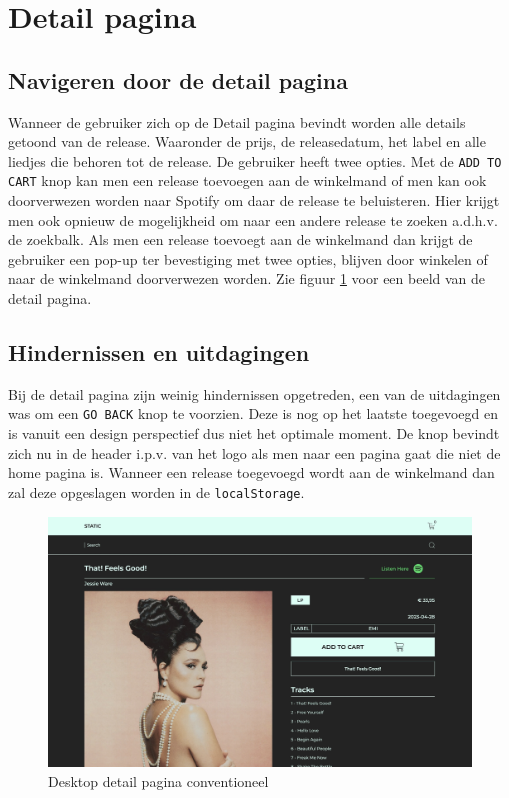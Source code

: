 \newpage

\section{Detail pagina}

\subsection{Navigeren door de detail pagina}

Wanneer de gebruiker zich op de Detail pagina bevindt worden alle details getoond van de release. Waaronder de prijs, de releasedatum, het label en alle liedjes die behoren tot de release. De gebruiker heeft twee opties. Met de \texttt{ADD TO CART} knop kan men een release toevoegen aan de winkelmand of men kan ook doorverwezen worden naar Spotify om daar de release te beluisteren. Hier krijgt men ook opnieuw de mogelijkheid om naar een andere release te zoeken a.d.h.v. de zoekbalk. Als men een release toevoegt aan de winkelmand dan krijgt de gebruiker een pop-up ter bevestiging met twee opties, blijven door winkelen of naar de winkelmand doorverwezen worden. Zie figuur \ref{fig:desktopDetailConventioneel} voor een beeld van de detail pagina.

\subsection{Hindernissen en uitdagingen}

Bij de detail pagina zijn weinig hindernissen opgetreden, een van de uitdagingen was om een \texttt{GO BACK} knop te voorzien. Deze is nog op het laatste toegevoegd en is vanuit een design perspectief dus niet het optimale moment. De knop bevindt zich nu in de header i.p.v. van het logo als men naar een pagina gaat die niet de home pagina is. Wanneer een release toegevoegd wordt aan de winkelmand dan zal deze opgeslagen worden in de \texttt{localStorage}.

\begin{figure}[h]
	\centering
	\includegraphics[width=1\linewidth]{graphics/desktopDetailConventioneel}
	\caption[Desktop detail pagina conventioneel]{Desktop detail pagina conventioneel}
	\label{fig:desktopDetailConventioneel}
\end{figure}

